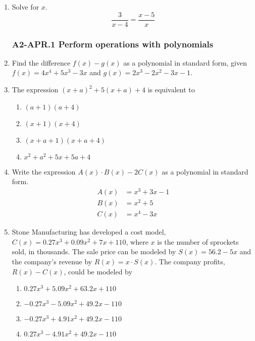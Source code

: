 \documentclass[12pt, twoside]{article}
\begin{document}
\begin{enumerate}[itemsep=0.5cm]
\item Solve for $x$.
$$\frac{3}{x-4} = \frac{x-5}{x}$$ \vspace{4cm}

\newpage
\subsubsection*{A2-APR.1 Perform operations with polynomials}
\item Find the difference $f(x)-g(x)$ as a polynomial in standard form, given \\[0.25cm]
    $f(x)=4x^4+5x^3-3x$ and $g(x)=2x^3-2x^2-3x-1$. \vspace{8cm}


\item The expression $(x + a)^2 + 5(x + a) + 4$ is equivalent to %
\begin{multicols}{2}
\begin{enumerate}
        \item $(a + 1)(a + 4)$
        \item $(x + 1)(x + 4)$
        \item $(x + a + 1)(x + a + 4)$
        \item $x^2 + a^2 + 5x + 5a + 4$
    \end{enumerate}
\end{multicols}

\newpage
\item Write the expression $A(x) \cdot B(x) - 2C(x)$ as a polynomial in standard form. %
\begin{align*}
    A(x) &= x^3 + 3x - 1 \\
    B(x) &= x^2 + 5 \\
    C(x) &= x^4 - 3x
\end{align*} \vspace{6cm}

\item Stone Manufacturing has developed a cost model, $C(x) = 0.27x^3 + 0.09x^2 + 7x + 110$, where $x$ is the number of sprockets sold, in thousands. The sale price can be modeled by $S(x) = 56.2 - 5x$ and the company's revenue by $R(x) = x \cdot S(x)$. The company profits, $R(x) - C(x)$, could be modeled by %
\begin{enumerate}
    \item $0.27x^3 + 5.09x^2 + 63.2x + 110$
    \item $-0.27x^3 - 5.09x^2 + 49.2x - 110$
    \item $-0.27x^3 + 4.91x^2 + 49.2x - 110$
    \item $0.27x^3 - 4.91x^2 + 49.2x - 110$
\end{enumerate}


\end{enumerate}
\end{document}
